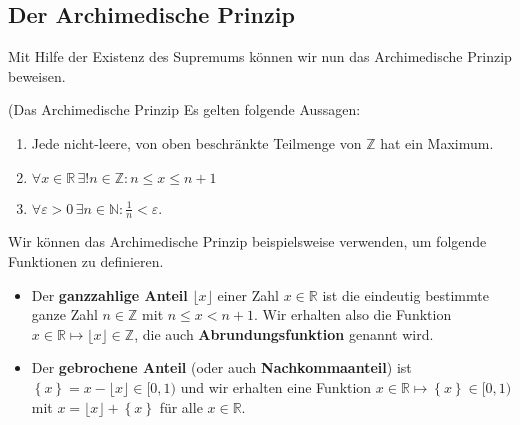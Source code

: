 \documentclass[../Analysis1_script.tex]{subfiles}
\begin{document}
\subsection{Der Archimedische Prinzip}

Mit Hilfe der Existenz des Supremums können wir nun das Archimedische Prinzip beweisen.

\begin{proposition}{(Das Archimedische Prinzip}
	Es gelten folgende Aussagen: 
	\begin{enumerate}
		\item Jede nicht-leere, von oben beschränkte Teilmenge von $\mathbb{Z}$ hat ein Maximum.
		\item $\forall x \in \mathbb{R} \, \exists! n \in \mathbb{Z} : n \leq x \leq n + 1$
		\item $\forall \varepsilon > 0 \, \exists n \in \mathbb{N}: \frac{1}{n} < \varepsilon$.
	\end{enumerate}
\end{proposition}

Wir können das Archimedische Prinzip beispielsweise verwenden, um folgende Funktionen zu definieren. 
\begin{itemize}
	\item Der \textbf{ganzzahlige Anteil} $\lfloor {x} \rfloor$ einer Zahl $x\in \mathbb {R}$ ist die eindeutig bestimmte ganze Zahl $n\in \mathbb {Z}$ mit $n \leq x < n+1$. Wir erhalten also die Funktion $x \in \mathbb {R} \mapsto \lfloor {x} \rfloor \in \mathbb {Z}$, die auch \textbf{Abrundungsfunktion} genannt wird. 
	\item Der \textbf{gebrochene Anteil} (oder auch \textbf{Nachkommaanteil}) ist $\left \lbrace {x} \right \rbrace = x - \lfloor {x} \rfloor \in [0,1)$ und wir erhalten eine Funktion $x \in \mathbb {R} \mapsto \left \lbrace {x} \right \rbrace \in [0,1)$ mit $x=\lfloor {x} \rfloor +\left \lbrace {x} \right \rbrace$ für alle $x\in \mathbb {R}$.
\end{itemize}
\end{document}
